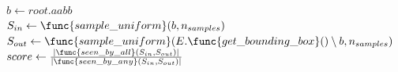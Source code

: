 \begin{algorithm}[b]
    \caption{Recursive construction of the VI-tree}%
    \label{alg:vi:tree:recursive}
    \SetAlgoLined%
    $b \gets root.aabb$\\
    $S_{in} \gets \func{sample\_uniform}(b, n_{samples})$
    \label{vi:tree:recursive:line:ample:in}\\
    $S_{out} \gets \func{sample\_uniform}(E.\func{get\_bounding\_box}() \setminus b , n_{samples})$
    \label{vi:tree:recursive:line:ample:out}
    \\
    $score \gets \frac{|\func{seen\_by\_all}(S_{in},S_{out})|}{|\func{seen\_by\_any}(S_{in},S_{out})|}$ 
    \label{vi:tree:recursive:line:vi}\\
    \Return  
\end{algorithm}


